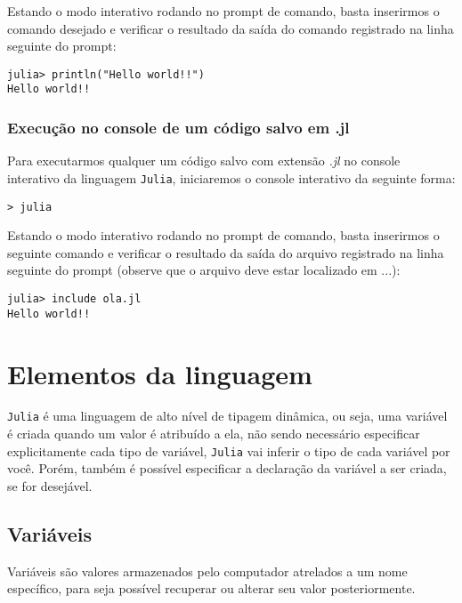 Estando o modo interativo rodando no prompt de comando, basta inserirmos o comando desejado e verificar o resultado da saída do comando registrado na linha seguinte do prompt:

\begin{lstlisting}
julia> println("Hello world!!")
Hello world!!
\end{lstlisting}

\subsubsection{Execução no console de um código salvo em .jl}

Para executarmos qualquer um código salvo com extensão \emph{.jl} no console interativo da linguagem \verb+Julia+, iniciaremos o console interativo da seguinte forma:

\begin{lstlisting}[style=c]
> julia
\end{lstlisting}

Estando o modo interativo rodando no prompt de comando, basta inserirmos o seguinte comando e verificar o resultado da saída do arquivo registrado na linha seguinte do prompt (observe que o arquivo deve estar localizado em ...):

\begin{lstlisting}
julia> include ola.jl
Hello world!!
\end{lstlisting}

\section{Elementos da linguagem}

\verb+Julia+ é uma linguagem de alto nível de tipagem dinâmica, ou seja, uma variável é criada quando um valor é atribuído a ela, não sendo necessário especificar explicitamente cada tipo de variável, \verb+Julia+ vai inferir o tipo de cada variável por você. Porém, também é possível especificar a declaração da variável a ser criada, se for desejável.

\subsection{Variáveis}

Variáveis são valores armazenados pelo computador atrelados a um nome específico, para seja possível recuperar ou alterar seu valor posteriormente. 

